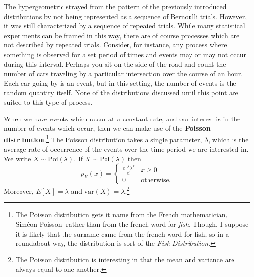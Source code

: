 \documentclass[
  letterpaper,
  DIV=11,
  numbers=noendperiod]{scrreprt}
\theoremstyle{definition}
\theoremstyle{definition}
\theoremstyle{definition}
\theoremstyle{remark}
\begin{document}
The hypergeometric strayed from the pattern of the previously introduced
distributions by not being represented as a sequence of Bernoulli
trials. However, it was still characterized by a sequence of repeated
trials. While many statistical experiments can be framed in this way,
there are of course processes which are not described by repeated
trials. Consider, for instance, any process where something is observed
for a set period of times and events may or may not occur during this
interval. Perhaps you sit on the side of the road and count the number
of cars traveling by a particular intersection over the course of an
hour. Each car going by is an event, but in this setting, the number of
events is the random quantity itself. None of the distributions
discussed until this point are suited to this type of process.

When we have events which occur at a constant rate, and our interest is
in the number of events which occur, then we can make use of the
\textbf{Poisson distribution}.\footnote{The Poisson distribution gets it
  name from the French mathematician, Siméon Poisson, rather than from
  the french word for \emph{fish}. Though, I suppose it is likely that
  the surname came from the french word for fish, so in a roundabout
  way, the distribution is sort of the \emph{Fish Distribution}.} The
Poisson distribution takes a single parameter, \(\lambda\), which is the
average rate of occurrence of the events over the time period we are
interested in. We write \(X\sim\text{Poi}(\lambda)\). If
\(X\sim\text{Poi}(\lambda)\) then
\[p_X(x) = \begin{cases} \frac{e^{-\lambda}\lambda^x}{x!} & x \geq 0 \\ 0 &\text{otherwise}.\end{cases}\]
Moreover, \(E[X]=\lambda\) and \(\text{var}(X) = \lambda\).\footnote{The
  Poisson distribution is interesting in that the mean and variance are
  always equal to one another.}
\end{document}
